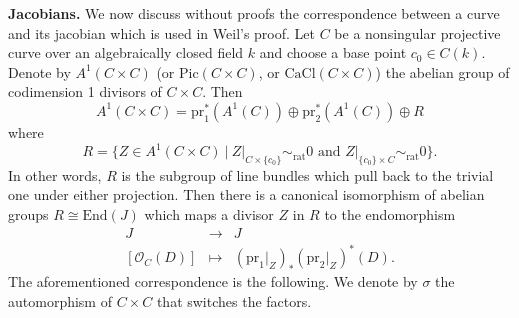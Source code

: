 \noindent
{\bf Jacobians.}
We now discuss without proofs the correspondence between a curve and its
jacobian which is used in Weil's proof. Let $C$ be a nonsingular projective
curve over an algebraically closed field $k$ and choose a base point $c_0 \in
C(k)$. Denote by $A^1(C \times C)$ (or $\text{Pic} (C \times C)$, or
$\text{CaCl}(C \times C)$) the abelian group of codimension 1 divisors of
$C \times C$. Then
$$
A^1(C \times C) = \text{pr}_1^* (A^1(C)) \oplus \text{pr}_2^* (A^1(C)) \oplus R
$$
where
$$
R = \{ Z \in A^1(C \times C) \ |
\ Z|_{C \times \{c_0\}} \sim_\text{rat} 0
\text{ and }
Z|_{\{c_0\} \times C} \sim_\text{rat} 0 \}.
$$
In other words,
$R$ is the subgroup of line bundles which pull back to the trivial one under
either projection. Then there is a canonical isomorphism of abelian groups $R
\cong \text{End}(J)$ which maps a divisor $Z$ in $R$ to the endomorphism
$$
\begin{matrix}
J & \to & J \\
\left[ \mathcal{O}_C(D) \right] & \mapsto & (\text{pr}_1 |_Z)_* (\text{pr}_2
|_Z)^* (D).
\end{matrix}
$$
The aforementioned correspondence is the following. We denote by $\sigma$ the
automorphism of $C \times C$ that switches the factors.
